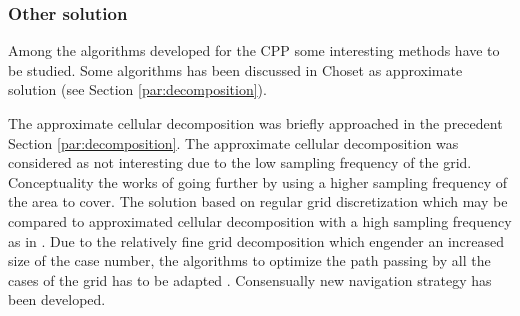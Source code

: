 %		
%		
		
		\subsubsection{Other solution}
		
		Among the algorithms developed for the CPP some interesting methods have to be studied.		
		Some algorithms has been discussed in Choset \cite{214*choset2001} as approximate solution (see Section \ref{par:decomposition}). 
		
		 The approximate cellular decomposition was briefly approached in the precedent Section \ref{par:decomposition}. The approximate cellular decomposition was considered as  not interesting due to the low sampling frequency of the grid. Conceptuality the works of \citep{216*luo2002,196*yang2004,215*lee2010} going further by using a higher sampling frequency of the area to cover. The  solution based on regular grid discretization which may be compared to  approximated cellular decomposition with a high sampling frequency as in \citep{218*meiting2007}.
		  Due to the relatively fine grid decomposition which engender an increased size of the case number, the algorithms to optimize the path  passing by all the cases of the grid has to be adapted . Consensually  new navigation strategy has been developed. 
		

